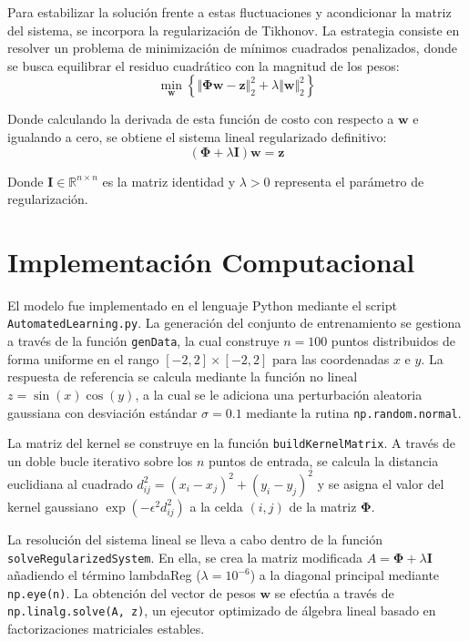 \documentclass[12pt]{article}
\begin{document}
        Para estabilizar la solución frente a estas fluctuaciones y acondicionar la matriz del sistema, se incorpora la regularización de Tikhonov. La estrategia consiste en resolver un problema de minimización de mínimos cuadrados penalizados, donde se busca equilibrar el residuo cuadrático con la magnitud de los pesos:
        \begin{equation}
            \min_{\mathbf{w}} \left\{ \Vert{}\mathbf{\Phi} \mathbf{w} - \mathbf{z}\Vert_2^2 + \lambda \Vert{}\mathbf{w}\Vert_2^2 \right\}
        \end{equation}

        Donde calculando la derivada de esta función de costo con respecto a $\mathbf{w}$ e igualando a cero, se obtiene el sistema lineal regularizado definitivo:
        \begin{equation}
            (\mathbf{\Phi} + \lambda \mathbf{I}) \mathbf{w} = \mathbf{z}
        \end{equation}

        Donde $\mathbf{I} \in \mathbb{R}^{n \times n}$ es la matriz identidad y $\lambda > 0$ representa el parámetro de regularización.

    \section{Implementación Computacional}
        El modelo fue implementado en el lenguaje Python mediante el script \texttt{AutomatedLearning.py}. La generación del conjunto de entrenamiento se gestiona a través de la función \texttt{genData}, la cual construye $n=100$ puntos distribuidos de forma uniforme en el rango $[-2, 2] \times [-2, 2]$ para las coordenadas $x$ e $y$. La respuesta de referencia se calcula mediante la función no lineal $z = \sin(x)\cos(y)$, a la cual se le adiciona una perturbación aleatoria gaussiana con desviación estándar $\sigma = 0.1$ mediante la rutina \texttt{np.random.normal}.

        La matriz del kernel se construye en la función \texttt{buildKernelMatrix}. A través de un doble bucle iterativo sobre los $n$ puntos de entrada, se calcula la distancia euclidiana al cuadrado $d_{ij}^2 = (x_i - x_j)^2 + (y_i - y_j)^2$ y se asigna el valor del kernel gaussiano $\exp(-\epsilon^2 d_{ij}^2)$ a la celda $(i,j)$ de la matriz $\mathbf{\Phi}$.

        La resolución del sistema lineal se lleva a cabo dentro de la función \texttt{solveRegularizedSystem}. En ella, se crea la matriz modificada $A = \mathbf{\Phi} + \lambda \mathbf{I}$ añadiendo el término lambdaReg ($\lambda = 10^{-6}$) a la diagonal principal mediante \texttt{np.eye(n)}. La obtención del vector de pesos $\mathbf{w}$ se efectúa a través de \texttt{np.linalg.solve(A, z)}, un ejecutor optimizado de álgebra lineal basado en factorizaciones matriciales estables.
\end{document}
